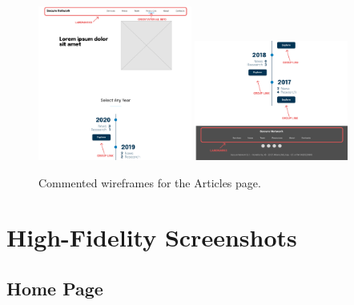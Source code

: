 \documentclass[12pt]{report}
\begin{document}
\begin{figure}[H]
	\centering
	\includegraphics[width=0.45\textwidth]{low_fid_wireframes/all_articles/1.png}
	\includegraphics[width=0.45\textwidth]{low_fid_wireframes/all_articles/2.png}
	\caption{Commented wireframes for the Articles page.}
\end{figure}

\section{High-Fidelity Screenshots}

\subsection{Home Page}
\end{document}
